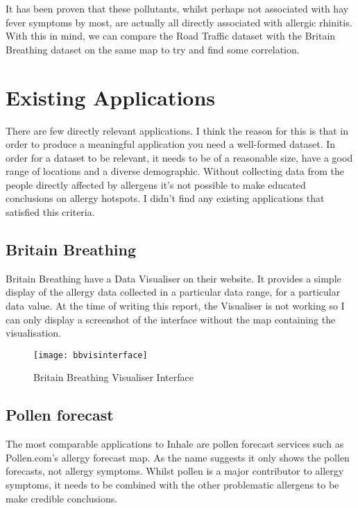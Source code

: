 It has been proven that these pollutants, whilst perhaps not associated with hay fever symptoms by most, are actually all directly associated with allergic rhinitis\cite{airPollution}. With this in mind, we can compare the Road Traffic dataset with the Britain Breathing dataset on the same map to try and find some correlation.\\

\section{Existing Applications}
\label{sec:diagrams}

There are few directly relevant applications. I think the reason for this is that in order to produce a meaningful application you need a well-formed dataset. In order for a dataset to be relevant, it needs to be of a reasonable size, have a good range of locations and a diverse demographic. Without collecting data from the people directly affected by allergens it's not possible to make educated conclusions on allergy hotspots. I didn't find any existing applications that satisfied this criteria.\\

\subsection{Britain Breathing}
Britain Breathing have a Data Visualiser on their website. It provides a simple display of the allergy data collected in a particular data range, for a particular data value. At the time of writing this report, the Visualiser is not working so I can only display a screenshot of the interface without the map containing the visualisation.

\begin{figure}[H]
\begin{center}
\texttt{[image: bbvisinterface]}
\caption{Britain Breathing Visualiser Interface}
\end{center}
\end{figure}

\subsection{Pollen forecast}

The most comparable applications to Inhale are pollen forecast services such as Pollen.com's allergy forecast map. As the name suggests it only shows the pollen forecasts, not allergy symptoms. Whilst pollen is a major contributor to allergy symptoms, it needs to be combined with the other problematic allergens to be make credible conclusions.\\

